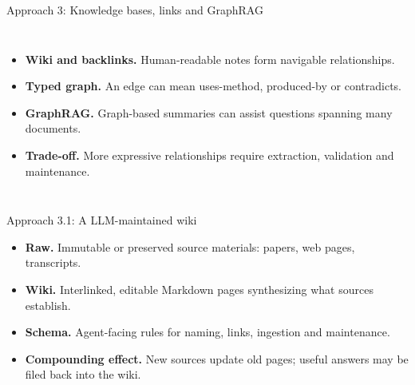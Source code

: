 \begin{frame}{Approach 3: Knowledge bases, links and GraphRAG}
\begin{columns}[c,onlytextwidth]
\begin{itemize}\setlength{\itemsep}{.48em}\small
\item \textbf{Wiki and backlinks.} Human-readable notes form navigable relationships.
\item \textbf{Typed graph.} An edge can mean uses-method, produced-by or contradicts.
\item \textbf{GraphRAG.} Graph-based summaries can assist questions spanning many documents.
\item \textbf{Trade-off.} More expressive relationships require extraction, validation and maintenance.
\end{itemize}
\end{columns}
\end{frame}

\begin{frame}{Approach 3.1: A LLM-maintained wiki}
\begin{itemize}\setlength{\itemsep}{.6em}
\item \textbf{Raw.} Immutable or preserved source materials: papers, web pages, transcripts.
\item \textbf{Wiki.} Interlinked, editable Markdown pages synthesizing what sources establish.
\item \textbf{Schema.} Agent-facing rules for naming, links, ingestion and maintenance.
\item \textbf{Compounding effect.} New sources update old pages; useful answers may be filed back into the wiki.
\end{itemize}
\medskip
{}
\end{frame}

